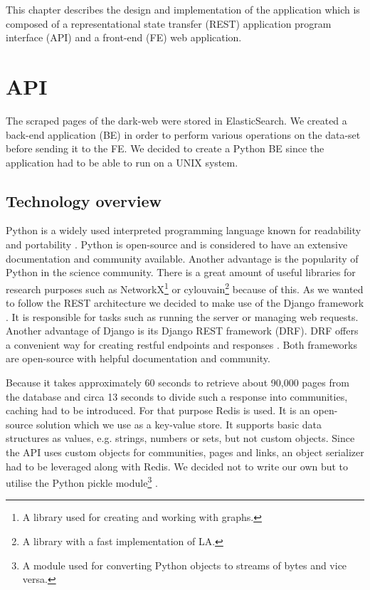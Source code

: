This chapter describes the design and implementation of the application which is composed of a representational state transfer (REST) application program interface (API) and a front-end (FE) web application. 

\section{API}
The scraped pages of the dark-web were stored in ElasticSearch. We created a back-end application (BE) in order to perform various operations on the data-set before sending it to the FE. We decided to create a Python BE since the application had to be able to run on a UNIX system. 
\subsection{Technology overview}
Python is a widely used interpreted programming language known for  readability and portability \cite{aboutPython}. Python is open-source and is considered to have an extensive documentation and community available. Another advantage is the popularity of Python in the science community. There is a great amount of useful libraries for research purposes such as NetworkX\footnote{A library used for creating and working with graphs.} \cite{networkX} or cylouvain\footnote{A library with a fast implementation of LA.} \cite{cylouvain} because of this.  
As we wanted to follow the REST architecture we decided to make use of the Django framework \cite{meetDjango}. It is responsible for tasks such as running the server or managing web requests. Another advantage of Django is its Django REST framework (DRF). DRF offers a convenient way for creating restful endpoints and responses \cite{djangoRest}. Both frameworks are open-source with helpful documentation and community. 

Because it takes approximately 60 seconds to retrieve about 90,000 pages from the database and circa 13 seconds to divide such a response into communities, caching had to be introduced. For that purpose Redis \cite{redis} is used. It is an open-source solution which we use as a key-value store. It supports  basic data structures as values, e.g. strings, numbers or sets, but not custom objects. Since the API uses custom objects for communities, pages and links, an object serializer had to be leveraged along with Redis. We decided not to write our own but to utilise the Python pickle module\footnote{A module used for converting Python objects to streams of bytes and vice versa.} \cite{pickle}. 


